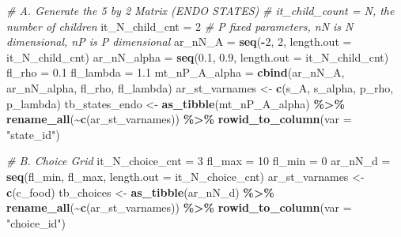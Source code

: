 \documentclass[
]{book}
\newenvironment{Shaded}{\begin{snugshade}}{\end{snugshade}}
\newcommand{\CommentTok}[1]{\textcolor[rgb]{0.56,0.35,0.01}{\textit{#1}}}
\newcommand{\DataTypeTok}[1]{\textcolor[rgb]{0.13,0.29,0.53}{#1}}
\newcommand{\DecValTok}[1]{\textcolor[rgb]{0.00,0.00,0.81}{#1}}
\newcommand{\FloatTok}[1]{\textcolor[rgb]{0.00,0.00,0.81}{#1}}
\newcommand{\KeywordTok}[1]{\textcolor[rgb]{0.13,0.29,0.53}{\textbf{#1}}}
\newcommand{\NormalTok}[1]{#1}
\newcommand{\OperatorTok}[1]{\textcolor[rgb]{0.81,0.36,0.00}{\textbf{#1}}}
\newcommand{\StringTok}[1]{\textcolor[rgb]{0.31,0.60,0.02}{#1}}
\begin{document}
\begin{Shaded}
\begin{Highlighting}[]
\CommentTok{\# A. Generate the 5 by 2 Matrix (ENDO STATES)}
\CommentTok{\# it\_child\_count = N, the number of children}
\NormalTok{it\_N\_child\_cnt =}\StringTok{ }\DecValTok{2}
\CommentTok{\# P fixed parameters, nN is N dimensional, nP is P dimensional}
\NormalTok{ar\_nN\_A =}\StringTok{ }\KeywordTok{seq}\NormalTok{(}\OperatorTok{{-}}\DecValTok{2}\NormalTok{, }\DecValTok{2}\NormalTok{, }\DataTypeTok{length.out =}\NormalTok{ it\_N\_child\_cnt)}
\NormalTok{ar\_nN\_alpha =}\StringTok{ }\KeywordTok{seq}\NormalTok{(}\FloatTok{0.1}\NormalTok{, }\FloatTok{0.9}\NormalTok{, }\DataTypeTok{length.out =}\NormalTok{ it\_N\_child\_cnt)}
\NormalTok{fl\_rho =}\StringTok{ }\FloatTok{0.1}
\NormalTok{fl\_lambda =}\StringTok{ }\FloatTok{1.1}
\NormalTok{mt\_nP\_A\_alpha =}\StringTok{ }\KeywordTok{cbind}\NormalTok{(ar\_nN\_A, ar\_nN\_alpha, fl\_rho, fl\_lambda)}
\NormalTok{ar\_st\_varnames \textless{}{-}}\StringTok{ }\KeywordTok{c}\NormalTok{(}\StringTok{\textquotesingle{}s\_A\textquotesingle{}}\NormalTok{, }\StringTok{\textquotesingle{}s\_alpha\textquotesingle{}}\NormalTok{, }\StringTok{\textquotesingle{}p\_rho\textquotesingle{}}\NormalTok{, }\StringTok{\textquotesingle{}p\_lambda\textquotesingle{}}\NormalTok{)}
\NormalTok{tb\_states\_endo \textless{}{-}}\StringTok{ }\KeywordTok{as\_tibble}\NormalTok{(mt\_nP\_A\_alpha) }\OperatorTok{\%\textgreater{}\%}\StringTok{ }
\StringTok{  }\KeywordTok{rename\_all}\NormalTok{(}\OperatorTok{\textasciitilde{}}\KeywordTok{c}\NormalTok{(ar\_st\_varnames)) }\OperatorTok{\%\textgreater{}\%}\StringTok{ }
\StringTok{  }\KeywordTok{rowid\_to\_column}\NormalTok{(}\DataTypeTok{var =} \StringTok{"state\_id"}\NormalTok{) }

\CommentTok{\# B. Choice Grid}
\NormalTok{it\_N\_choice\_cnt =}\StringTok{ }\DecValTok{3}
\NormalTok{fl\_max =}\StringTok{ }\DecValTok{10}
\NormalTok{fl\_min =}\StringTok{ }\DecValTok{0}
\NormalTok{ar\_nN\_d =}\StringTok{ }\KeywordTok{seq}\NormalTok{(fl\_min, fl\_max, }\DataTypeTok{length.out =}\NormalTok{ it\_N\_choice\_cnt)}
\NormalTok{ar\_st\_varnames \textless{}{-}}\StringTok{ }\KeywordTok{c}\NormalTok{(}\StringTok{\textquotesingle{}c\_food\textquotesingle{}}\NormalTok{)}
\NormalTok{tb\_choices \textless{}{-}}\StringTok{ }\KeywordTok{as\_tibble}\NormalTok{(ar\_nN\_d) }\OperatorTok{\%\textgreater{}\%}\StringTok{ }
\StringTok{  }\KeywordTok{rename\_all}\NormalTok{(}\OperatorTok{\textasciitilde{}}\KeywordTok{c}\NormalTok{(ar\_st\_varnames)) }\OperatorTok{\%\textgreater{}\%}\StringTok{ }
\StringTok{  }\KeywordTok{rowid\_to\_column}\NormalTok{(}\DataTypeTok{var =} \StringTok{"choice\_id"}\NormalTok{) }


\end{Highlighting}
\end{Shaded}
\end{document}
